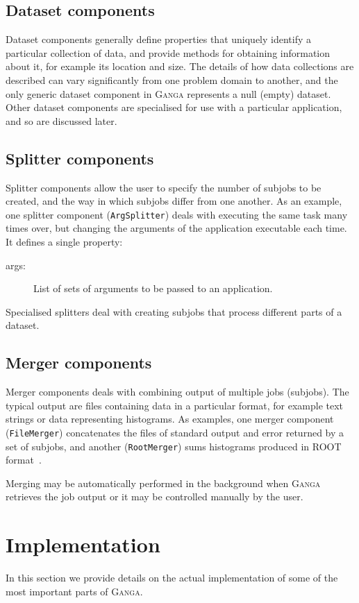 \documentclass{elsart}
\def\ganga {\textsc{Ganga}\xspace}
\newcommand{\code}[1]{\texttt{#1}}
\begin{document}
\subsection{Dataset components}
Dataset components generally define properties that uniquely identify a
particular collection of data, and provide methods for obtaining information
about it, for example its location and size. The details of how data
collections are described can vary significantly from one problem domain to
another, and the only generic dataset component in \ganga represents a null
(empty) dataset.  Other dataset components are specialised for use with a
particular application, and so are discussed later.

\subsection{Splitter components}
Splitter components allow the user to specify the number of subjobs to be
created, and the way in which subjobs differ from one another. As an example,
one splitter component (\code{ArgSplitter}) deals with executing the same task
many times over, but changing the arguments of the application executable each
time. It defines a single property:
\begin{description}
\item[args:] List of sets of arguments to be passed to an application.
\end{description}
Specialised splitters deal with creating subjobs that process different parts
of a dataset.

\subsection{Merger components}
Merger components deals with combining output of multiple jobs (subjobs). The
typical output are files containing data in a particular format, for example
text strings or data representing histograms. As examples, one merger
component (\code{FileMerger}) concatenates the files of standard output and
error returned by a set of subjobs, and another (\code{RootMerger}) sums
histograms produced in ROOT format~\cite{ROOT}.

Merging may be automatically performed in the background when \ganga retrieves
the job output or it may be controlled manually by the user.

\section{Implementation}
\label{sec:implementation}
In this section we provide details on the actual implementation of some of the
most important parts of \ganga.
\end{document}
